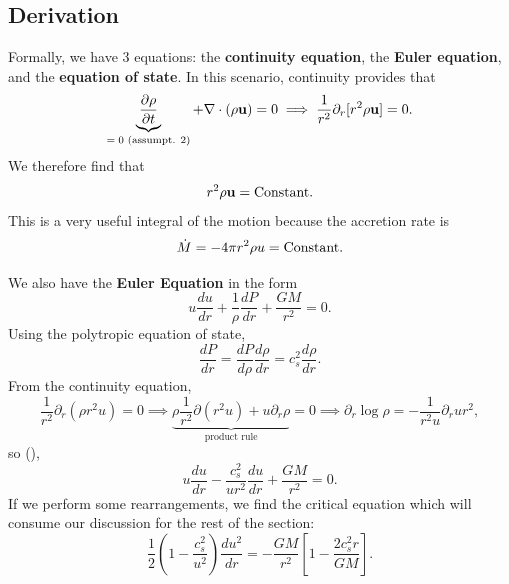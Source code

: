 \subsection*{Derivation}

Formally, we have 3 equations: the \textbf{continuity equation}, the \textbf{Euler equation}, and the \textbf{equation of state}. In this scenario, continuity provides that
\[
\underbrace{\frac{\partial \rho}{\partial t}}_{\text{$=0$ (assumpt. 2)}} + \nabla \cdot(\rho{\bf u}) = 0 \implies \frac{1}{r^2} \partial_r[r^2 \rho {\bf u}] = 0.
\]
We therefore find that
\[
r^2 \rho {\bf u} = \rm{Constant}.
\]
This is a very useful integral of the motion because the accretion rate is
\[
\dot{M} = -4\pi r^2 \rho u = {\rm Constant}.
\]
\par
We also have the \textbf{Euler Equation} in the form
\[
u \frac{du}{dr} + \frac{1}{\rho}\frac{dP}{dr} + \frac{GM}{r^2} = 0.
\]
Using the polytropic equation of state,
\[
\frac{dP}{dr} = \frac{dP}{d\rho} \frac{d\rho}{dr} = c_s^2 \frac{d\rho}{dr}.
\]
 From the continuity equation,
\[
\frac{1}{r^2} \partial_r (\rho r^2 u) = 0 \implies \underbrace{\rho \frac{1}{r^2}\partial(r^2u) + u \partial_r \rho}_{\text{product rule}} = 0 \implies \partial_r \log \rho = - \frac{1}{r^2 u} \partial_r ur^2,
\]
so (),
\[
u \frac{du}{dr} - \frac{c_s^2}{ur^2} \frac{du}{dr} + \frac{GM}{r^2} = 0.
\]
If we perform some rearrangements, we find the critical equation which will consume our discussion for the rest of the section:
\begin{equation}
    \boxed{
    \frac{1}{2}\left(1-\frac{c_s^2}{u^2}\right) \frac{du^2}{dr} = -\frac{GM}{r^2} \left[1-\frac{2c_s^2 r}{GM}\right].
    }
\end{equation}

